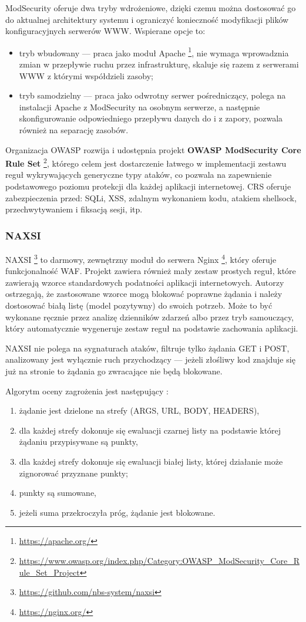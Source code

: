 \documentclass[11pt,a4paper,polish,thesis,oneside]{dcsbook}
\begin{document}
ModSecurity oferuje dwa tryby wdrożeniowe, dzięki czemu można dostosować go do aktualnej architektury systemu i ograniczyć konieczność modyfikacji plików konfiguracyjnych serwerów WWW. Wspierane opcje to:
\begin{itemize}
\item tryb wbudowany --- praca jako moduł Apache \footnote{\url{https://apache.org/}}, nie wymaga wprowadznia zmian w przepływie ruchu przez infrastrukturę, skaluje się razem z serwerami WWW z którymi współdzieli zasoby;
\item tryb samodzielny --- praca jako odwrotny serwer pośredniczący, polega na instalacji Apache z ModSecurity na osobnym serwerze, a następnie skonfigurowanie odpowiedniego przepływu danych do i z zapory, pozwala również na separację zasobów.
\end{itemize}

Organizacja OWASP rozwija i udostępnia projekt \textbf{OWASP ModSecurity Core Rule Set} \footnote{\url{https://www.owasp.org/index.php/Category:OWASP_ModSecurity_Core_Rule_Set_Project}}, którego celem jest dostarczenie łatwego w implementacji zestawu reguł wykrywających generyczne typy ataków, co pozwala na zapewnienie podstawowego poziomu protekcji dla każdej aplikacji internetowej. CRS oferuje zabezpieczenia przed: SQLi, XSS, zdalnym wykonaniem kodu, atakiem shellsock, przechwytywaniem i fiksacją sesji, itp.

\subsubsection{NAXSI}
NAXSI \footnote{\url{https://github.com/nbs-system/naxsi}} to darmowy, zewnętrzny moduł do serwera Nginx \footnote{\url{https://nginx.org/}}, który oferuje funkcjonalność WAF. Projekt zawiera również mały zestaw prostych reguł, które zawierają wzorce standardowych podatności aplikacji internetowych. Autorzy ostrzegają, że zastosowane wzorce mogą blokować poprawne żądania i należy dostosować białą listę (model pozytywny) do swoich potrzeb. Może to być wykonane ręcznie przez analizę dzienników zdarzeń albo przez tryb samouczący, który automatycznie wygeneruje zestaw reguł na podstawie zachowania aplikacji.

NAXSI nie polega na sygnaturach ataków, filtruje tylko żądania GET i POST, analizowany jest wyłącznie ruch przychodzący --- jeżeli złośliwy kod znajduje się już na stronie to żądania go zwracające nie będą blokowane.

Algorytm oceny zagrożenia jest następujący \cite{naxsi-sekurak}:
\begin{enumerate}
\item żądanie jest dzielone na strefy (ARGS, URL, BODY, HEADERS),
\item dla każdej strefy dokonuje się ewaluacji czarnej listy na podstawie której żądaniu przypisywane są punkty,
\item dla każdej strefy dokonuje się ewaluacji białej listy, której działanie może zignorować przyznane punkty;
\item punkty są sumowane,
\item jeżeli suma przekroczyła próg, żądanie jest blokowane.
\end{enumerate}
\end{document}
